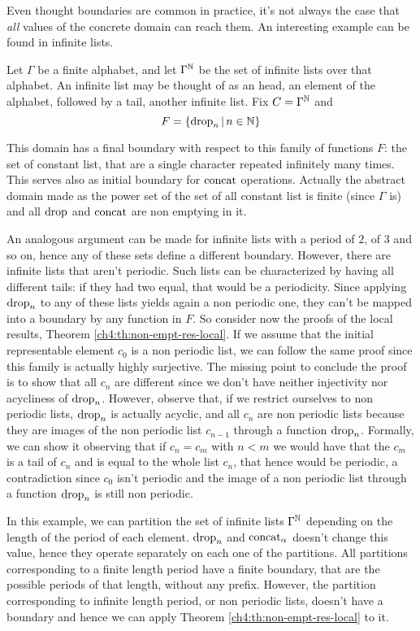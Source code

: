 Even thought boundaries are common in practice, it's not always the case that \textit{all} values of the concrete domain can reach them. An interesting example can be found in infinite lists.
\begin{example}\label{ch4:ex:infinite-lists-fix-c0}
	Let $\Gamma$ be a finite alphabet, and let $\Gamma^{\mathbb{N}}$ be the set of infinite lists over that alphabet. An infinite list may be thought of as an head, an element of the alphabet, followed by a tail, another infinite list.
	Fix $C = \Gamma^{\mathbb{N}}$ and
	\[
	F = \{ \text{drop}_n \,\vert\, n \in \mathbb{N} \}
	\]

	This domain has a final boundary with respect to this family of functions $F$: the set of constant list, that are a single character repeated infinitely many times.
	This serves also as initial boundary for $\text{concat}$ operations. Actually the abstract domain made as the power set of the set of all constant list is finite (since $\Gamma$ is) and all $\text{drop}$ and $\text{concat}$ are non emptying in it.

	An analogous argument can be made for infinite lists with a period of $2$, of $3$ and so on, hence any of these sets define a different boundary.
	However, there are infinite lists that aren't periodic. Such lists can be characterized by having all different tails: if they had two equal, that would be a periodicity. Since applying $\text{drop}_n$ to any of these lists yields again a non periodic one, they can't be mapped into a boundary by any function in $F$.
	So consider now the proofs of the local results, Theorem \ref{ch4:th:non-empt-res-local}. If we assume that the initial representable element $c_0$ is a non periodic list, we can follow the same proof since this family is actually highly surjective. The missing point to conclude the proof is to show that all $c_n$ are different since we don't have neither injectivity nor acycliness of $\text{drop}_n$.
	However, observe that, if we restrict ourselves to non periodic lists, $\text{drop}_n$ is actually acyclic, and all $c_n$ are non periodic lists because they are images of the non periodic list $c_{n-1}$ through a function $\text{drop}_n$.
	Formally, we can show it observing that if $c_n = c_m$ with $n < m$ we would have that the $c_m$ is a tail of $c_n$ and is equal to the whole list $c_n$, that hence would be periodic, a contradiction since $c_0$ isn't periodic and the image of a non periodic list through a function $\text{drop}_n$ is still non periodic.
\end{example}
In this example, we can partition the set of infinite lists $\Gamma^{\mathbb{N}}$ depending on the length of the period of each element. $\text{drop}_n$ and $\text{concat}_{\alpha}$ doesn't change this value, hence they operate separately on each one of the partitions. All partitions corresponding to a finite length period have a finite boundary, that are the possible periods of that length, without any prefix. However, the partition corresponding to infinite length period, or non periodic lists, doesn't have a boundary and hence we can apply Theorem \ref{ch4:th:non-empt-res-local} to it.

